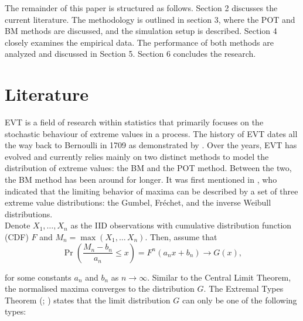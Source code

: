 \documentclass[a4paper,12pt]{article}
\theoremstyle{plain}
\begin{document}
The remainder of this paper is structured as follows. Section 2 discusses the current literature. The methodology is outlined in section 3, where the POT and BM methods are discussed, and the simulation setup is described. Section 4 closely examines the empirical data. The performance of both methods are analyzed and discussed in Section 5. Section 6 concludes the research.

\newpage
\section{Literature}
EVT is a field of research within statistics that primarily focuses on the stochastic behaviour of extreme values in a process. The history of EVT dates all the way back to Bernoulli in 1709 as demonstrated by . Over the years, EVT has evolved and currently relies mainly on two distinct methods to model the distribution of extreme values: the BM and the POT method. Between the two, the BM method has been around for longer. It was first mentioned in , who indicated that the limiting behavior of maxima can be described by a set of three extreme value distributions: the Gumbel, Fr\'echet, and the inverse Weibull distributions. \\

Denote $X_1, \dots, X_n$ as the IID observations with cumulative distribution function (CDF) $F$ and $M_n = \max\left(X_1,\dots\,X_n\right)$. Then, assume that 
\begin{equation}
\Pr\left(\frac{M_n-b_n}{a_n}\leq x\right)=F^n\left(a_nx+b_n\right)\to G\left(x\right),
\end{equation}

\noindent for some constants $a_n$ and $b_n$ as $n\to\infty$. Similar to the Central Limit Theorem, the normalised maxima converges to the distribution $G$. The Extremal Types Theorem (; ) states that the limit distribution $G$ can only be one of the following types:
\end{document}
